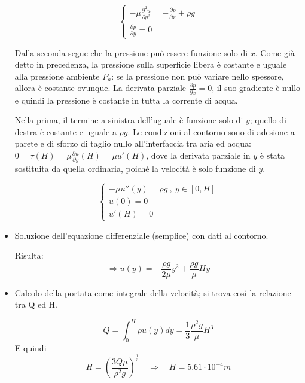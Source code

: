 \begin{itemize}
\begin{equation}
\begin{cases}
  - \mu \frac{\partial^2 u}{\partial y^2} = - \frac{\partial p}{\partial x} + \rho g\\
  \frac{\partial p}{\partial y} = 0  
\end{cases}
\end{equation}

Dalla seconda segue che la pressione può essere funzione solo di $x$. Come già detto in precedenza, la pressione sulla superficie libera è costante e uguale alla pressione ambiente $P_a$: se la pressione non può variare nello spessore, allora è costante ovunque. La derivata parziale $\frac{\partial p}
 {\partial x}=0$, il suo gradiente è nullo e quindi la pressione è costante
 in tutta la corrente di acqua.

 Nella prima, il termine a sinistra dell'uguale è funzione solo di $y$; quello di destra è costante e uguale a $\rho g$. Le condizioni al contorno sono
 di adesione a parete e di sforzo di taglio nullo all'interfaccia tra aria
 ed acqua: $0=\tau(H)=\mu \frac{\partial u}{\partial y}(H)=\mu u'(H)$, dove 
 la derivata parziale in $y$ è stata sostituita da quella ordinaria, poichè
 la velocità è solo funzione di $y$.
  
  \begin{equation}
  \begin{cases}
    - \mu u''(y) = \rho g \ , \ y \in[0,H] \\
    u(0) = 0  \\ u'(H) = 0
  \end{cases}
  \end{equation}
  
  
  
  \item Soluzione dell'equazione differenziale (semplice) con dati al contorno.
  
  Risulta:
  \begin{equation}
    \Rightarrow u(y) = - \frac{\rho g}{2 \mu} y^2 + \frac{\rho g}{\mu} H y
  \end{equation}
  
  \item Calcolo della portata come integrale della velocità; si trova così la relazione tra Q ed H.
  
  \begin{equation}
    Q = \int_{0}^{H} \rho u(y) dy = \frac{1}{3}\frac{\rho^2 g}{\mu} H^3 
  \end{equation}
  E quindi
  \begin{equation}
     H = \left( \frac{3 Q \mu}{\rho^2 g} \right) ^ {\frac{1}{3}}
     \quad \Rightarrow \quad H = 5.61 \cdot 10^{-4} m
  \end{equation}
  

\end{itemize}
